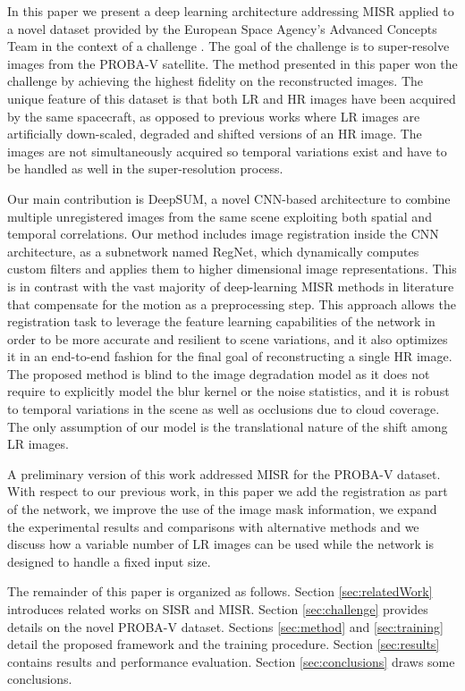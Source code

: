 \documentclass[journal]{IEEEtran}
\begin{document}
In this paper we present a deep learning architecture addressing MISR applied to a novel dataset provided by the European Space Agency's Advanced Concepts Team in the context of a challenge \cite{web:kelvins}. The goal of the challenge is to super-resolve images from the PROBA-V satellite. The method presented in this paper won the challenge by achieving the highest fidelity on the reconstructed images.
The unique feature of this dataset is that both LR and HR images have been acquired by the same spacecraft, as opposed to previous works where LR images are artificially down-scaled, degraded and shifted versions of an HR image. The images are not simultaneously acquired so temporal variations exist and have to be handled as well in the super-resolution process.

Our main contribution is DeepSUM, a novel CNN-based architecture to combine multiple unregistered images from the same scene exploiting both spatial and temporal correlations. Our method includes image registration inside the CNN architecture, as a subnetwork named RegNet, which dynamically computes custom filters and applies them to higher dimensional image representations. This is in contrast with the vast majority of deep-learning MISR methods in literature \cite{superdeep} that compensate for the motion as a preprocessing step. This approach allows the registration task to leverage the feature learning capabilities of the network in order to be more accurate and resilient to scene variations, and it also optimizes it in an end-to-end fashion for the final goal of reconstructing a single HR image. The proposed method is blind to the image degradation model as it does not require to explicitly model the blur kernel or the noise statistics, and it is robust to temporal variations in the scene as well as occlusions due to cloud coverage. The only assumption of our model is the translational nature of the shift among LR images.  

A preliminary version of this work \cite{Bordone_Proba-V} addressed MISR for the PROBA-V dataset. With respect to our previous work, in this paper we add the registration as part of the network, we improve the use of the image mask information, we expand the experimental results and comparisons with alternative methods and we discuss how a variable number of LR images can be used while the network is designed to handle a fixed input size.

The remainder of this paper is organized as follows. Section \ref{sec:relatedWork} introduces related works on SISR and MISR. Section \ref{sec:challenge} provides details on the novel PROBA-V dataset. Sections \ref{sec:method} and \ref{sec:training} detail the proposed framework and the training procedure. Section \ref{sec:results} contains results and performance evaluation. Section \ref{sec:conclusions} draws some conclusions.
\end{document}
